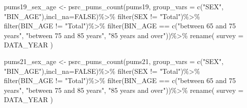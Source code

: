 \documentclass[
  12pt,
]{article}
\newenvironment{Shaded}{\begin{snugshade}}{\end{snugshade}}
\newcommand{\AttributeTok}[1]{\textcolor[rgb]{0.77,0.63,0.00}{#1}}
\newcommand{\ConstantTok}[1]{\textcolor[rgb]{0.00,0.00,0.00}{#1}}
\newcommand{\FunctionTok}[1]{\textcolor[rgb]{0.00,0.00,0.00}{#1}}
\newcommand{\NormalTok}[1]{#1}
\newcommand{\OtherTok}[1]{\textcolor[rgb]{0.56,0.35,0.01}{#1}}
\newcommand{\SpecialCharTok}[1]{\textcolor[rgb]{0.00,0.00,0.00}{#1}}
\newcommand{\StringTok}[1]{\textcolor[rgb]{0.31,0.60,0.02}{#1}}
\begin{document}
\begin{Shaded}
\begin{Highlighting}[]
\NormalTok{pums19\_sex\_age }\OtherTok{\textless{}{-}} \FunctionTok{psrc\_pums\_count}\NormalTok{(pums19, }\AttributeTok{group\_vars =} \FunctionTok{c}\NormalTok{(}\StringTok{"SEX"}\NormalTok{, }\StringTok{"BIN\_AGE"}\NormalTok{),}\AttributeTok{incl\_na=}\ConstantTok{FALSE}\NormalTok{)}\SpecialCharTok{\%\textgreater{}\%}
  \FunctionTok{filter}\NormalTok{(SEX }\SpecialCharTok{!=} \StringTok{"Total"}\NormalTok{)}\SpecialCharTok{\%\textgreater{}\%}
  \FunctionTok{filter}\NormalTok{(BIN\_AGE }\SpecialCharTok{!=} \StringTok{"Total"}\NormalTok{)}\SpecialCharTok{\%\textgreater{}\%}
  \FunctionTok{filter}\NormalTok{(BIN\_AGE }\SpecialCharTok{==} \FunctionTok{c}\NormalTok{(}\StringTok{"between 65 and 75 years"}\NormalTok{, }\StringTok{"between 75 and 85 years"}\NormalTok{, }\StringTok{"85 years and over"}\NormalTok{))}\SpecialCharTok{\%\textgreater{}\%}
  \FunctionTok{rename}\NormalTok{(}
    \AttributeTok{survey =}\NormalTok{ DATA\_YEAR}
\NormalTok{  )}


\NormalTok{pums21\_sex\_age }\OtherTok{\textless{}{-}} \FunctionTok{psrc\_pums\_count}\NormalTok{(pums21, }\AttributeTok{group\_vars =} \FunctionTok{c}\NormalTok{(}\StringTok{"SEX"}\NormalTok{, }\StringTok{"BIN\_AGE"}\NormalTok{),}\AttributeTok{incl\_na=}\ConstantTok{FALSE}\NormalTok{)}\SpecialCharTok{\%\textgreater{}\%}
  \FunctionTok{filter}\NormalTok{(SEX }\SpecialCharTok{!=} \StringTok{"Total"}\NormalTok{)}\SpecialCharTok{\%\textgreater{}\%}
  \FunctionTok{filter}\NormalTok{(BIN\_AGE }\SpecialCharTok{!=} \StringTok{"Total"}\NormalTok{)}\SpecialCharTok{\%\textgreater{}\%}
  \FunctionTok{filter}\NormalTok{(BIN\_AGE }\SpecialCharTok{==} \FunctionTok{c}\NormalTok{(}\StringTok{"between 65 and 75 years"}\NormalTok{, }\StringTok{"between 75 and 85 years"}\NormalTok{, }\StringTok{"85 years and over"}\NormalTok{))}\SpecialCharTok{\%\textgreater{}\%}
  \FunctionTok{rename}\NormalTok{(}
    \AttributeTok{survey =}\NormalTok{ DATA\_YEAR}
\NormalTok{  )}
\end{Highlighting}
\end{Shaded}
\end{document}
